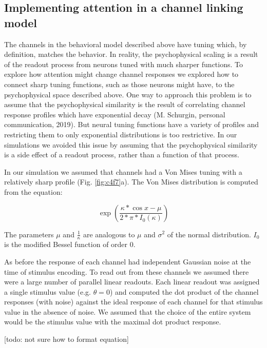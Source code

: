 \subsection{Implementing attention in a channel linking model}

The channels in the behavioral model described above have tuning which, by definition, matches the behavior. In reality, the psychophysical scaling is a result of the readout process from neurons tuned with much sharper functions. To explore how attention might change channel responses we explored how to connect sharp tuning functions, such as those neurons might have, to the psychophysical space described above. One way to approach this problem is to assume that the psychophysical similarity is the result of correlating channel response profiles which have exponential decay (M. Schurgin, personal communication, 2019). But neural tuning functions have a variety of profiles and restricting them to only exponential distributions is too restrictive. In our simulations we avoided this issue by assuming that the psychophysical similarity is a side effect of a readout process, rather than a function of that process.

In our simulation we assumed that channels had a Von Mises tuning with a relatively sharp profile (Fig. \ref{fig:c4f7}a). The Von Mises distribution is computed from the equation:

\begin{equation}
    \exp(\frac{\kappa*\cos{x-\mu}}{2*\pi*I_0(\kappa)})
\end{equation}

The parameters $\mu$ and $\frac{1}{\kappa}$ are analogous to $\mu$ and $\sigma^2$ of the normal distribution. $I_0$ is the modified Bessel function of order 0.

As before the response of each channel had independent Gaussian noise at the time of stimulus encoding. To read out from these channels we assumed there were a large number of parallel linear readouts. Each linear readout was assigned a single stimulus value (e.g. $\theta=0$) and computed the dot product of the channel responses (with noise) against the ideal response of each channel for that stimulus value in the absence of noise. We assumed that the choice of the entire system would be the stimulus value with the maximal dot product response.

[todo: not sure how to format equation]


